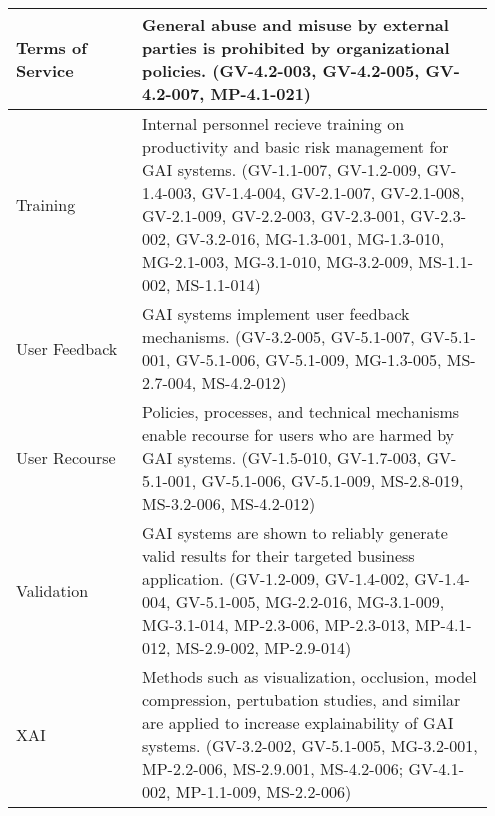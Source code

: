 \documentclass[fleqn]{article}
\begin{document}
\begin{table}[H]
\begin{tabular}{|m{0.25\linewidth} |m{0.70\linewidth} |}
		\hline
		Terms of Service & General abuse and misuse by external parties is prohibited by organizational policies. (GV-4.2-003, GV-4.2-005, GV-4.2-007, MP-4.1-021)  \\ 
		\hline
		Training  & Internal personnel recieve training on productivity and basic risk management for GAI systems. (GV-1.1-007, GV-1.2-009, GV-1.4-003, GV-1.4-004, GV-2.1-007, GV-2.1-008, GV-2.1-009, GV-2.2-003, GV-2.3-001, GV-2.3-002, GV-3.2-016, MG-1.3-001, MG-1.3-010, MG-2.1-003, MG-3.1-010, MG-3.2-009, MS-1.1-002, MS-1.1-014)  \\ 
		\hline
		User Feedback & GAI systems implement user feedback mechanisms. (GV-3.2-005, GV-5.1-007, GV-5.1-001, GV-5.1-006, GV-5.1-009, MG-1.3-005, MS-2.7-004, MS-4.2-012)  \\ 
		\hline
		User Recourse & Policies, processes, and technical mechanisms enable recourse for users who are harmed by GAI systems. (GV-1.5-010, GV-1.7-003, GV-5.1-001, GV-5.1-006, GV-5.1-009, MS-2.8-019, MS-3.2-006, MS-4.2-012) \\ 
		\hline
		Validation & GAI systems are shown to reliably generate valid results for their targeted business application. (GV-1.2-009, GV-1.4-002, GV-1.4-004, GV-5.1-005, MG-2.2-016, MG-3.1-009, MG-3.1-014, MP-2.3-006, MP-2.3-013, MP-4.1-012, MS-2.9-002, MP-2.9-014) \\ 
		\hline
		XAI & Methods such as visualization, occlusion, model compression, pertubation studies, and similar are applied to increase explainability of GAI systems. (GV-3.2-002, GV-5.1-005, MG-3.2-001, MP-2.2-006, MS-2.9.001, MS-4.2-006; GV-4.1-002, MP-1.1-009, MS-2.2-006) \\ 
		\hline
	\end{tabular}
\end{table}
\end{document}
